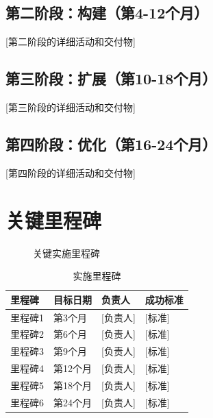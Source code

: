 \documentclass[11pt,letterpaper]{report}
\begin{document}
{\subsection{第二阶段：构建（第4-12个月）}
[第二阶段的详细活动和交付物]

\subsection{第三阶段：扩展（第10-18个月）}
[第三阶段的详细活动和交付物]

\subsection{第四阶段：优化（第16-24个月）}
[第四阶段的详细活动和交付物]

\section{关键里程碑}


\begin{figure}[htbp]
\centering
\caption{关键实施里程碑}
\label{fig:milestones}
\end{figure}

\begin{table}[htbp]
\centering
\caption{实施里程碑}
\begin{tabular}{@{}llll@{}}
\toprule
\textbf{里程碑} & \textbf{目标日期} & \textbf{负责人} & \textbf{成功标准} \\
\midrule
里程碑1 & 第3个月 & [负责人] & [标准] \\
\rowcolor{tablealt} 里程碑2 & 第6个月 & [负责人] & [标准] \\
里程碑3 & 第9个月 & [负责人] & [标准] \\
\rowcolor{tablealt} 里程碑4 & 第12个月 & [负责人] & [标准] \\
里程碑5 & 第18个月 & [负责人] & [标准] \\
\rowcolor{tablealt} 里程碑6 & 第24个月 & [负责人] & [标准] \\
\bottomrule
\end{tabular}
\label{tab:milestones}
\end{table}

}
\end{document}
